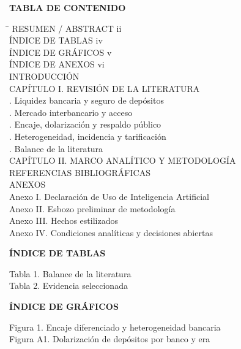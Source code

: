 \documentclass[11pt,a4paper]{article}
\newcommand{\TocIntro}{\pageref{sec:intro}}
\newcommand{\TocCapII}{\pageref{sec:marco}}
\newcommand{\TocRefs}{\pageref{sec:refs}}
\newcommand{\TocAnexos}{\pageref{sec:anexos}}
\newcommand{\TocAnI}{\pageref{sec:anexo-ia}}
\newcommand{\TocAnII}{\pageref{sec:anexo-met}}
\newcommand{\TocAnIII}{\pageref{sec:anexo-hechos}}
\newcommand{\TocAnIV}{\pageref{sec:anexo-cond}}
\newcommand{\TocBal}{\pageref{tab:balance}}
\newcommand{\TocTabDos}{\pageref{tab:evidencia}}
\newcommand{\TocFigUno}{\pageref{fig:uno}}
\newcommand{\TocFigA}{\pageref{fig:auno}}
\begin{document}
\begin{center}\textbf{TABLA DE CONTENIDO}\end{center}
\vspace{0.2cm}
\noindent
\begin{tabbing}
\hspace{11.5cm}\= \kill
RESUMEN / ABSTRACT \> ii\\[3pt]
ÍNDICE DE TABLAS \> iv\\[3pt]
ÍNDICE DE GRÁFICOS \> v\\[3pt]
ÍNDICE DE ANEXOS \> vi\\[5pt]
INTRODUCCIÓN \> \TocIntro\\[3pt]
CAPÍTULO I. REVISIÓN DE LA LITERATURA \\[2pt]
. Liquidez bancaria y seguro de depósitos \\[2pt]
. Mercado interbancario y acceso \\[2pt]
. Encaje, dolarización y respaldo público \\[2pt]
. Heterogeneidad, incidencia y tarificación \\[2pt]
. Balance de la literatura \\[3pt]
CAPÍTULO II. MARCO ANALÍTICO Y METODOLOGÍA \> \TocCapII\\[3pt]
REFERENCIAS BIBLIOGRÁFICAS \> \TocRefs\\[5pt]
ANEXOS \> \TocAnexos\\[2pt]
\quad Anexo I. Declaración de Uso de Inteligencia Artificial \> \TocAnI\\[2pt]
\quad Anexo II. Esbozo preliminar de metodología \> \TocAnII\\[2pt]
\quad Anexo III. Hechos estilizados \> \TocAnIII\\[2pt]
\quad Anexo IV. Condiciones analíticas y decisiones abiertas \> \TocAnIV
\end{tabbing}
\clearpage

\begin{center}\textbf{ÍNDICE DE TABLAS}\end{center}
\noindent Tabla 1. Balance de la literatura \dotfill \TocBal\\[3pt]
Tabla 2. Evidencia seleccionada \dotfill \TocTabDos
\clearpage

\begin{center}\textbf{ÍNDICE DE GRÁFICOS}\end{center}
\noindent Figura 1. Encaje diferenciado y heterogeneidad bancaria \dotfill \TocFigUno\\[3pt]
Figura A1. Dolarización de depósitos por banco y era \dotfill \TocFigA
\clearpage
\end{document}
